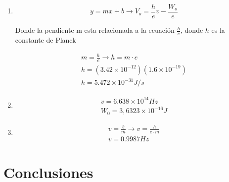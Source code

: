 \documentclass[letterpaper, 12pt]{article}
\begin{document}
\begin{enumerate}
      \item \begin{equation*}
                  y = mx + b \rightarrow V_{o} = \frac{h}{e}v - \frac{W_{o}}{e}
            \end{equation*}

            Donde la pendiente m esta relacionada a la ecuación
            $\frac{h}{e}$, donde $h$ es la constante de Planck

            \begin{equation*}
                  \begin{gathered}
                        m = \frac{h}{e} \rightarrow h = m \cdot e \\
                        h = (3.42 \times 10^{-12}) (1.6 \times 10^{-19}) \\
                        h = 5.472 \times 10^{-31} J/s
                  \end{gathered}
            \end{equation*}

      \item \begin{equation*}
                  \begin{gathered}
                        v = 6.638 \times 10^{14} Hz \\
                        W_{0} = 3,6323 \times 10^{-16} J
                  \end{gathered}
            \end{equation*}

      \item \begin{equation*}
                  \begin{gathered}
                        v = \frac{b}{m} \rightarrow v = \frac{h}{e \cdot m} \\
                        v = 0.9987 Hz
                  \end{gathered}
            \end{equation*}
\end{enumerate}

\section{Conclusiones}

\printbibliography
\end{document}
